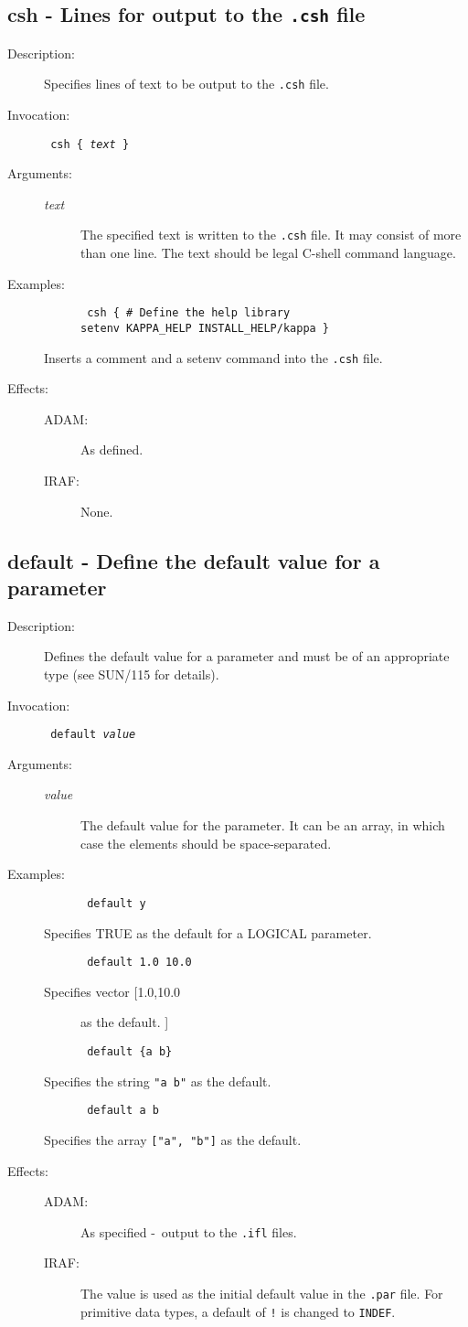 \documentclass[twoside,11pt]{article}
\newcommand{\xref}[3]{#1}
\newcommand{\xlabel}[1]{}
\newcommand{\dash}{--}
\newcommand{\tab}{\>}
\renewcommand{\dash}{-}
\renewcommand{\tab}{   }
\newlength{\sstbannerlength}
\newlength{\sstcaptionlength}
\newlength{\sstexampleslength}
\newlength{\sstexampleswidth}
\newcommand{\sstroutine}[3]{
   \goodbreak
   \rule{\textwidth}{0.5mm}
   \vspace{-7ex}
   \newline
   \settowidth{\sstbannerlength}{{\Large {\bf #1}}}
   \setlength{\sstcaptionlength}{\textwidth}
   \setlength{\sstexampleslength}{\textwidth}
   \addtolength{\sstbannerlength}{0.5em}
   \addtolength{\sstcaptionlength}{-2.0\sstbannerlength}
   \addtolength{\sstcaptionlength}{-5.0pt}
   \settowidth{\sstexampleswidth}{{\bf Examples:}}
   \addtolength{\sstexampleslength}{-\sstexampleswidth}
   \parbox[t]{\sstbannerlength}{\flushleft{\Large {\bf #1}}}
   \parbox[t]{\sstcaptionlength}{\center{\Large #2}}
   \parbox[t]{\sstbannerlength}{\flushright{\Large {\bf #1}}}
   \begin{description}
      #3
   \end{description}
}
\newcommand{\sstdescription}[1]{\item[Description:] #1}
\newcommand{\sstinvocation}[1]{\item[Invocation:]\hspace{0.4em}{\tt #1}}
\newcommand{\ssteffects}[1]{
   \item[Effects:] \mbox{} \\
   \vspace{-3.5ex}
   \begin{description}
      #1
   \end{description}
}
\newcommand{\sstarguments}[1]{
   \item[Arguments:] \mbox{} \\
   \vspace{-3.5ex}
   \begin{description}
      #1
   \end{description}
}
\newcommand{\sstexamples}[1]{
   \item[Examples:] \mbox{}
      #1
}
\newcommand{\sstsubsection}[1]{ \item[{#1}] \mbox{} \\}
\newcommand{\sstexamplesubsection}[2]
{   \vspace{-5ex}
\begin{quote} \texttt{\begin{tabbing}
xxx\=xxx\=\kill
#1
\end{tabbing}}
\end{quote}
#2}
\newcommand{\ssttt}{\tt}
\renewcommand{\sstroutine}[3]{
      \subsection{#1\xlabel{#1}-\label{#1}#2}
      \begin{description}
         #3
      \end{description}
   }
\renewcommand{\sstdescription}[1]{\item[Description:]
      \begin{description}
         #1
      \end{description}
   }
\renewcommand{\sstinvocation}[1]{\item[Invocation:]
      \begin{description}
         {\ssttt #1}
      \end{description}
   }
\renewcommand{\ssteffects}[1]{
      \item[Effects:]
      \begin{description}
         #1
      \end{description}
   }
\renewcommand{\sstarguments}[1]{
      \item[Arguments:]
      \begin{description}
         #1
      \end{description}
   }
\renewcommand{\sstexamples}[1]{
      \item[Examples:]
      \begin{description}
         #1
      \end{description}
   }
\renewcommand{\sstsubsection}[1]{\item[{#1}]}
\renewcommand{\sstexamplesubsection}[2]{\item[] {\ssttt #1} \\ \item[#2]}
\begin{document}
\sstroutine{
   csh
}{
   Lines for output to the \texttt{.csh} file
}{
   \sstdescription{
      Specifies lines of text to be output to the \texttt{.csh} file.
   }
   \sstinvocation{
      csh \{ \textit{text} \}
   }
   \sstarguments{
      \sstsubsection{
         \textit{text}
      }{
         The specified text is written to the \texttt{.csh} file. It may consist
         of more than one line. The text should be legal C-shell command 
         language.
      }
         
   }
   \sstexamples{
      \sstexamplesubsection{
         csh \{ \# Define the help library\\
         \tab setenv KAPPA\_HELP INSTALL\_HELP/kappa \}
      }{
         Inserts a comment and a setenv command into the \texttt{.csh} file.
      }
   }
   \ssteffects{
      \sstsubsection{ADAM:}{As defined.}
      \sstsubsection{IRAF:}{None.}
   }
}

\sstroutine{
   default
}{
   Define the default value for a parameter
}{
   \sstdescription{
      Defines the default value for a parameter and must be of an appropriate
      type (see
      \xref{SUN/115}{sun115}{}
      for details). 
   }
   \sstinvocation{
      default \textit{value}
   }
   \sstarguments{
      \sstsubsection{
         \textit{value}
      }{
         The default value for the parameter. It can be an array, in which case
         the elements should be space-separated.
      }
   }
   \sstexamples{
      \sstexamplesubsection{
         default y
      }{
         Specifies TRUE as the default for a LOGICAL parameter.
      }
      \sstexamplesubsection{
         default 1.0 10.0
      }{
         Specifies vector [1.0,10.0] as the default.
      }
      \sstexamplesubsection{
         default \{a b\}
      }{
         Specifies the string {\ssttt "a b"} as the default.
      }
      \sstexamplesubsection{
         default a b
      }{
         Specifies the array {\ssttt ["a", "b"]} as the default.
      }
   }
   \ssteffects{
      \sstsubsection{ADAM:}{As specified \dash\ output to the {\ssttt .ifl} 
                            files.}
      \sstsubsection{IRAF:}{The value is used as the initial default value in
                            the \texttt{.par} file. For primitive data types,
                            a default of \texttt{!} is changed to
                            \texttt{INDEF}.}
   }
}
\end{document}
